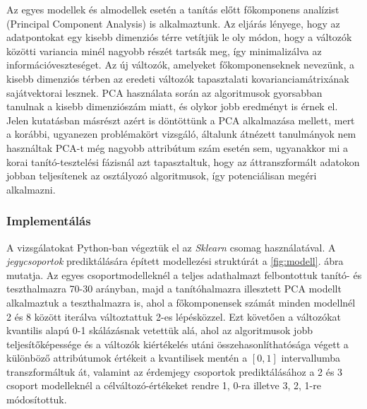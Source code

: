 \documentclass[12pt]{article}
\begin{document}
Az egyes modellek és almodellek esetén a tanítás előtt főkomponens analízist (Principal Component Analysis) is alkalmaztunk. Az eljárás lényege, hogy az adatpontokat egy kisebb dimenziós térre vetítjük le oly módon, hogy a változók közötti variancia minél nagyobb részét tartsák meg, így minimalizálva az információveszteséget\cite{PCA}. Az új változók, amelyeket főkomponenseknek nevezünk, a kisebb dimenziós térben az eredeti változók tapasztalati kovarianciamátrixának sajátvektorai lesznek. PCA használata során az algoritmusok gyorsabban tanulnak a kisebb dimenziószám miatt, és olykor jobb eredményt is érnek el. Jelen kutatásban másrészt azért is döntöttünk a PCA alkalmazása mellett, mert a korábbi, ugyanezen problémakört vizsgáló, általunk átnézett tanulmányok nem használtak PCA-t még nagyobb attribútum szám esetén sem, ugyanakkor mi a korai tanító-tesztelési fázisnál azt tapasztaltuk, hogy az áttranszformált adatokon jobban teljesítenek az osztályozó algoritmusok, így potenciálisan megéri alkalmazni.

\subsubsection*{Implementálás}

A vizsgálatokat Python-ban végeztük el az \textit{Sklearn}\cite{sklearn} csomag használatával. A \textit{jegycsoportok} prediktálására épített modellezési struktúrát a \ref{fig:modell}. ábra mutatja. Az egyes csoportmodelleknél a teljes adathalmazt felbontottuk tanító- és teszthalmazra 70-30 arányban, majd a tanítóhalmazra illesztett PCA modellt alkalmaztuk a teszthalmazra is, ahol a főkomponensek számát minden modellnél 2 és 8 között iterálva változtattuk 2-es lépésközzel. Ezt követően a változókat kvantilis alapú 0-1 skálázásnak vetettük alá, ahol az algoritmusok jobb teljesítőképessége és a változók kiértékelés utáni összehasonlíthatósága végett a különböző attribútumok értékeit a kvantilisek mentén a $[0, 1]$ intervallumba transzformáltuk át, valamint az érdemjegy csoportok prediktálásához a 2 és 3 csoport modelleknél a célváltozó-értékeket rendre 1, 0-ra illetve 3, 2, 1-re módosítottuk. 
\end{document}
